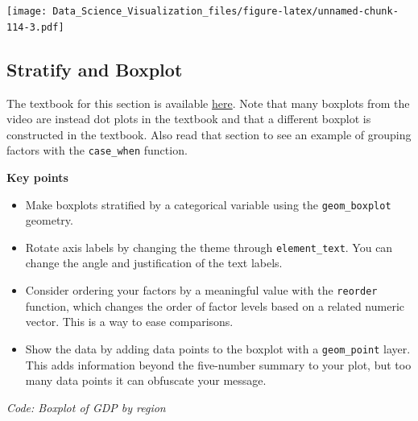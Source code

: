 \documentclass[
]{article}
\newenvironment{Shaded}{\begin{snugshade}}{\end{snugshade}}
\newcommand{\CommentTok}[1]{\textcolor[rgb]{0.56,0.35,0.01}{\textit{#1}}}
\newcommand{\DataTypeTok}[1]{\textcolor[rgb]{0.13,0.29,0.53}{#1}}
\newcommand{\DecValTok}[1]{\textcolor[rgb]{0.00,0.00,0.81}{#1}}
\newcommand{\KeywordTok}[1]{\textcolor[rgb]{0.13,0.29,0.53}{\textbf{#1}}}
\newcommand{\NormalTok}[1]{#1}
\newcommand{\OperatorTok}[1]{\textcolor[rgb]{0.81,0.36,0.00}{\textbf{#1}}}
\newcommand{\StringTok}[1]{\textcolor[rgb]{0.31,0.60,0.02}{#1}}
\providecommand{\tightlist}{%
  \setlength{\itemsep}{0pt}\setlength{\parskip}{0pt}}
\begin{document}
\texttt{[image: Data\_Science\_Visualization\_files/figure-latex/unnamed-chunk-114-3.pdf]}

\hypertarget{stratify-and-boxplot}{%
\subsection{Stratify and Boxplot}\label{stratify-and-boxplot}}

The textbook for this section is available
\href{https://rafalab.github.io/dsbook/gapminder.html\#comparing-multiple-distributions-with-boxplots-and-ridge-plots}{here}.
Note that many boxplots from the video are instead dot plots in the
textbook and that a different boxplot is constructed in the textbook.
Also read that section to see an example of grouping factors with the
\texttt{case\_when} function.

\textbf{Key points}

\begin{itemize}
\tightlist
\item
  Make boxplots stratified by a categorical variable using the
  \texttt{geom\_boxplot} geometry.
\item
  Rotate axis labels by changing the theme through
  \texttt{element\_text}. You can change the angle and justification of
  the text labels.
\item
  Consider ordering your factors by a meaningful value with the
  \texttt{reorder} function, which changes the order of factor levels
  based on a related numeric vector. This is a way to ease comparisons.
\item
  Show the data by adding data points to the boxplot with a
  \texttt{geom\_point} layer. This adds information beyond the
  five-number summary to your plot, but too many data points it can
  obfuscate your message.
\end{itemize}

\emph{Code: Boxplot of GDP by region}

\begin{Shaded}
\end{Shaded}
\end{document}
